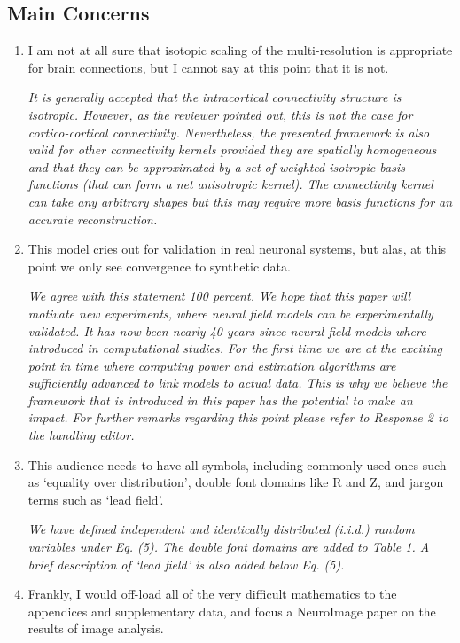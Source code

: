 \documentclass{article}
\begin{document}
    \subsection{Main Concerns}
		\begin{enumerate} 
			\item I am not at all sure that isotopic scaling of the multi-resolution is appropriate for brain connections, but I cannot say at this point that it is not.
			
			\emph{It is generally accepted that the intracortical connectivity structure is isotropic. However, as the reviewer pointed out, this is not the case for cortico-cortical connectivity. Nevertheless, the presented framework is also valid for other connectivity kernels provided they are spatially homogeneous and that they can be approximated by a set of weighted isotropic basis functions (that can form a net anisotropic kernel). The connectivity kernel can take any arbitrary shapes but this may require more basis functions for an accurate reconstruction.}
			 
			\item This model cries out for validation in real neuronal systems, but alas, at this point we only see convergence to synthetic data.   
			  
			 \emph{We agree with this statement 100 percent. We hope that this paper will motivate new experiments, where neural field models can be experimentally validated. It has now been nearly 40 years since neural field models where introduced in computational studies. For the first time we are at the exciting point in time where computing power and estimation algorithms are sufficiently advanced to link models to actual data. This is why we believe the framework that is introduced in this paper has the potential to make an impact. For further remarks regarding this point please refer to Response 2 to the handling editor.}
 
			
		\item This audience needs to have all symbols, including commonly used ones such as `equality over distribution', double font domains like R and Z, and jargon terms such as `lead field'.
			
		\emph{We have defined independent and identically distributed (i.i.d.) random variables under Eq. (5). The double font domains are added to Table 1. A brief description of `lead field' is also added below Eq. (5).}  
			
		\item Frankly, I would off-load all of the very difficult mathematics to the appendices and supplementary data, and focus a NeuroImage paper on the results of image analysis. 
			

\end{enumerate}
\end{document}
